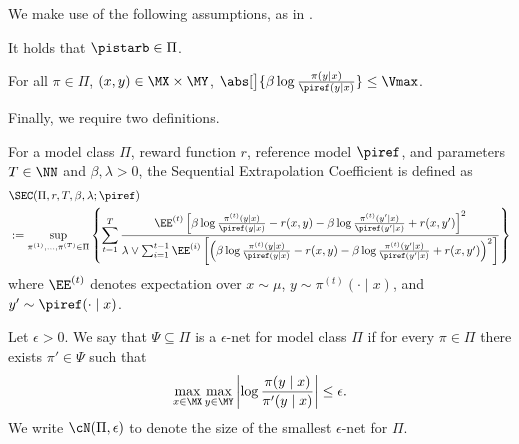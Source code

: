 We make use of the following assumptions, as in \iftoggle{workshop}{\cite{xie2024exploratory}}{\citet{xie2024exploratory}}.

\begin{assumption}[Realizability]\label{assumption:xpo-realizability}
It holds that $\pistarb \in \Pi$.
\end{assumption}

\begin{assumption}\label{assumption:xpo-bdr-apx}
For all $\pi \in \Pi$, $(x,y) \in \MX\times \MY$, $\abs[\big]{\beta \log \frac{\pi(y\mid x)}{\piref(y\mid x)}} \leq \Vmax$.
\end{assumption}

Finally, we require two definitions.

\begin{definition}\label{def:sec}
For a model class $\Pi$, reward function $r$, reference model $\piref$, and parameters $T \in \NN$ and $\beta,\lambda > 0$, the Sequential Extrapolation Coefficient is defined as
\begin{align}
&\SEC(\Pi,r,T,\beta,\lambda;\piref)  \\ 
&:= \sup_{\pi^{(1)},\dots,\pi^{(T)} \in \Pi}\left\{\sum_{t=1}^T\frac{\EE^{(t)}\left[\beta\log\frac{\pi^{(t)}(y\mid x)}{\piref(y\mid x)} - r(x,y) - \beta\log\frac{\pi^{(t)}(y'\mid x)}{\piref(y'\mid x)} + r(x,y')\right]^2}{\lambda \lor \sum_{i=1}^{t-1} \EE^{(i)}\left[\left(\beta\log\frac{\pi^{(t)}(y\mid x)}{\piref(y\mid x)} - r(x,y) - \beta\log\frac{\pi^{(t)}(y'\mid x)}{\piref(y'\mid x)} + r(x,y')\right)^2\right]}\right\}
\end{align}
where $\EE^{(t)}$ denotes expectation over $x \sim \mu$, $y \sim \pi^{(t)}(\cdot\mid x)$, and $y' \sim \piref(\cdot\mid x)$.
\end{definition}

\begin{definition}
Let $\epsilon>0$. We say that $\Psi \subseteq \Pi$ is a $\epsilon$-net for model class $\Pi$ if for every $\pi \in \Pi$ there exists $\pi' \in \Psi$ such that
\[\max_{x \in \MX} \max_{y \in \MY} \left| \log \frac{\pi(y\mid x)}{\pi'(y\mid x)}\right| \leq \epsilon.\]
We write $\cN(\Pi,\epsilon)$ to denote the size of the smallest $\epsilon$-net for $\Pi$.
\end{definition}

